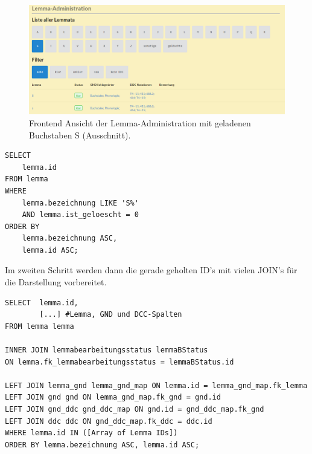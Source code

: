 \begin{figure}
	\centering
	\includegraphics[width=1\linewidth]{images/lemmaadministration_sample.PNG}
	\caption{Frontend Ansicht der Lemma-Administration mit geladenen Buchstaben S (Ausschnitt).}
	\label{img:lAdminSample}
\end{figure}

\lstset{language=SQL}
\begin{lstlisting}[frame=single] 
    SELECT
    lemma.id
FROM lemma
WHERE
    lemma.bezeichnung LIKE 'S%'
    AND lemma.ist_geloescht = 0
ORDER BY
    lemma.bezeichnung ASC,
    lemma.id ASC;
\end{lstlisting}

Im zweiten Schritt werden dann die gerade geholten ID’s mit vielen JOIN’s für die Darstellung vorbereitet.

\lstset{language=SQL}
\begin{lstlisting}[frame=single, label={lst:sqlQuery}] 
SELECT  lemma.id,                        
        [...] #Lemma, GND und DCC-Spalten        
FROM lemma lemma
      
INNER JOIN lemmabearbeitungsstatus lemmaBStatus
ON lemma.fk_lemmabearbeitungsstatus = lemmaBStatus.id

LEFT JOIN lemma_gnd lemma_gnd_map ON lemma.id = lemma_gnd_map.fk_lemma
LEFT JOIN gnd gnd ON lemma_gnd_map.fk_gnd = gnd.id
LEFT JOIN gnd_ddc gnd_ddc_map ON gnd.id = gnd_ddc_map.fk_gnd
LEFT JOIN ddc ddc ON gnd_ddc_map.fk_ddc = ddc.id
WHERE lemma.id IN ([Array of Lemma IDs])
ORDER BY lemma.bezeichnung ASC, lemma.id ASC;

\end{lstlisting}